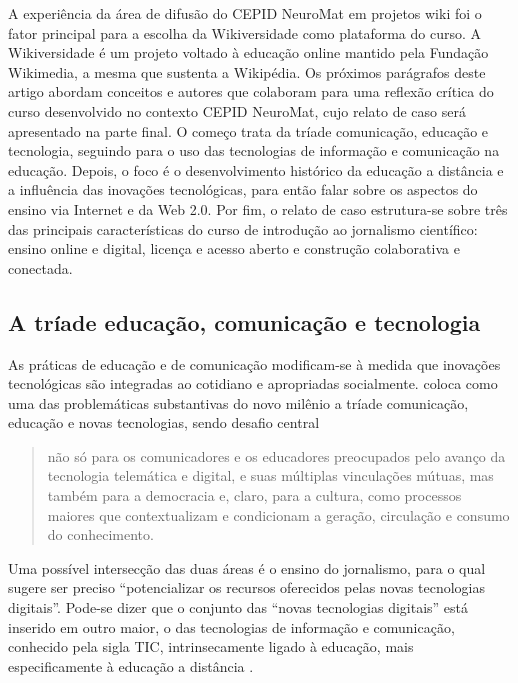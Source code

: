 \documentclass{textolivre}
\begin{document}
A experiência da área de difusão do CEPID NeuroMat em projetos wiki foi o fator principal para a escolha da Wikiversidade como plataforma do curso. A Wikiversidade é um projeto voltado à educação online mantido pela Fundação Wikimedia, a mesma que sustenta a Wikipédia. Os próximos parágrafos deste artigo abordam conceitos e autores que colaboram para uma reflexão crítica do curso desenvolvido no contexto CEPID NeuroMat, cujo relato de caso será apresentado na parte final. O começo trata da tríade comunicação, educação e tecnologia, seguindo para o uso das tecnologias de informação e comunicação na educação. Depois, o foco é o desenvolvimento histórico da educação a distância e a influência das inovações tecnológicas, para então falar sobre os aspectos do ensino via Internet e da Web 2.0. Por fim, o relato de caso estrutura-se sobre três das principais características do curso de introdução ao jornalismo científico: ensino online e digital, licença e acesso aberto e construção colaborativa e conectada.

\subsection{A tríade educação, comunicação e tecnologia}\label{sec-triade}

As práticas de educação e de comunicação modificam-se à medida que inovações tecnológicas são integradas ao cotidiano e apropriadas socialmente. \textcite[p. 57]{gomez2002} coloca como uma das problemáticas substantivas do novo milênio a tríade comunicação, educação e novas tecnologias, sendo desafio central

\begin{quote}não só para os comunicadores e os educadores preocupados pelo avanço da tecnologia telemática e digital, e suas múltiplas vinculações mútuas, mas também para a democracia e, claro, para a cultura, como processos maiores que contextualizam e condicionam a geração, circulação e consumo do conhecimento.\end{quote} 

Uma possível intersecção das duas áreas é o ensino do jornalismo, para o qual \textcite{melo2007} sugere ser preciso “potencializar os recursos oferecidos pelas novas tecnologias digitais”. Pode-se dizer que o conjunto das “novas tecnologias digitais” está inserido em outro maior, o das tecnologias de informação e comunicação, conhecido pela sigla TIC, intrinsecamente ligado à educação, mais especificamente à educação a distância 
\cites[p. 123]{belloni2002}[p. 99]{oliveira2016}.
\end{document}
